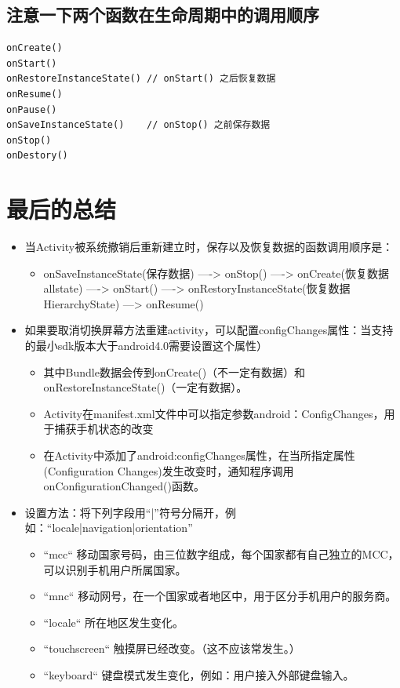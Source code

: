 \documentclass[9pt, b5paaper]{book}
\begin{document}
\subsection{注意一下两个函数在生命周期中的调用顺序}
\label{sec-1-3-4}
\begin{verbatim}
onCreate()
onStart()
onRestoreInstanceState() // onStart() 之后恢复数据
onResume()
onPause()
onSaveInstanceState()    // onStop() 之前保存数据
onStop()
onDestory()
\end{verbatim}
\section{最后的总结}
\label{sec-1-4}
\begin{itemize}
\item 当Activity被系统撤销后重新建立时，保存以及恢复数据的函数调用顺序是：
\begin{itemize}
\item onSaveInstanceState(保存数据) ----> onStop() 
----> onCreate(恢复数据allstate) ----> onStart() ----> onRestoryInstanceState(恢复数据HierarchyState) ---> onResume()
\end{itemize}
\item 如果要取消切换屏幕方法重建activity，可以配置configChanges属性：当支持的最小sdk版本大于android4.0需要设置这个属性）
\begin{itemize}
\item 其中Bundle数据会传到onCreate()（不一定有数据）和onRestoreInstanceState()（一定有数据）。
\item Activity在manifest.xml文件中可以指定参数android：ConfigChanges，用于捕获手机状态的改变
\item 在Activity中添加了android:configChanges属性，在当所指定属性(Configuration Changes)发生改变时，通知程序调用onConfigurationChanged()函数。
\end{itemize}
\item 设置方法：将下列字段用“|”符号分隔开，例如：“locale|navigation|orientation” 
\begin{itemize}
\item “mcc“ 移动国家号码，由三位数字组成，每个国家都有自己独立的MCC，可以识别手机用户所属国家。
\item “mnc“ 移动网号，在一个国家或者地区中，用于区分手机用户的服务商。
\item “locale“ 所在地区发生变化。
\item “touchscreen“ 触摸屏已经改变。（这不应该常发生。）
\item “keyboard“ 键盘模式发生变化，例如：用户接入外部键盘输入。

\end{itemize}
\end{itemize}
\end{document}
